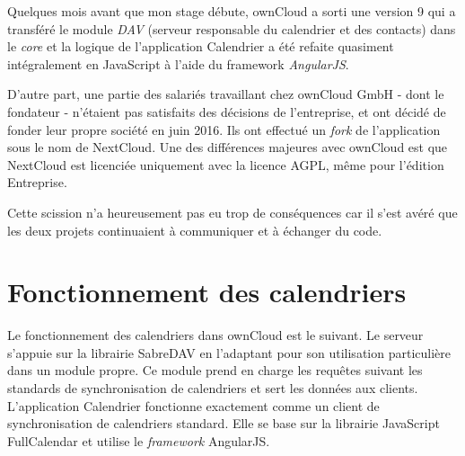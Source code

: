 \documentclass[10pt,a4paper, twoside]{report}
\begin{document}
	Quelques mois avant que mon stage débute, ownCloud a sorti une version 9 qui a transféré le module \textit{DAV} (serveur responsable du calendrier et des contacts) dans le \textit{core} et la logique de l'application Calendrier a été refaite quasiment intégralement en JavaScript à l'aide du framework \textit{AngularJS}.
	
	D'autre part, une partie des salariés travaillant chez ownCloud GmbH - dont le fondateur - n'étaient pas satisfaits des décisions de l'entreprise, et ont décidé de fonder leur propre société en juin 2016. Ils ont effectué un \textit{fork} de l'application sous le nom de NextCloud. Une des différences majeures avec ownCloud est que NextCloud est licenciée uniquement avec la licence AGPL, même pour l'édition Entreprise. 
	
	Cette scission n'a heureusement pas eu trop de conséquences car il s'est avéré que les deux projets continuaient à communiquer et à échanger du code.
	
	\section{Fonctionnement des calendriers}
	
	Le fonctionnement des calendriers dans ownCloud est le suivant. Le serveur s'appuie sur la librairie SabreDAV en l'adaptant pour son utilisation particulière dans un module propre. Ce module prend en charge les requêtes suivant les standards de synchronisation de calendriers et sert les données aux clients.
	\\
	
	L'application Calendrier fonctionne exactement comme un client de synchronisation de calendriers standard. Elle se base sur la librairie JavaScript FullCalendar et utilise le \textit{framework} AngularJS.
	
\end{document}
